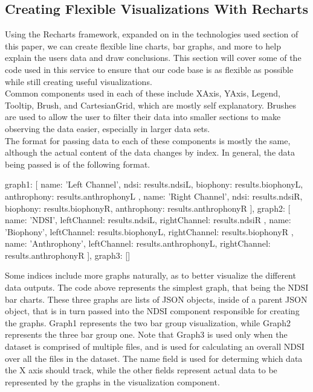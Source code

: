 \subsection{Creating Flexible Visualizations With Recharts}
Using the Recharts framework, expanded on in the technologies used section of this paper, we can create flexible line charts, bar graphs, and more to help explain the user\textquotesingle s data and draw conclusions. This section will cover some of the code used in this service to ensure that our code base is as flexible as possible while still creating useful visualizations.\\

\noindent Common components used in each of these include XAxis, YAxis, Legend, Tooltip, Brush, and CartesianGrid, which are mostly self explanatory. Brushes are used to allow the user to filter their data into smaller sections to make observing the data easier, especially in larger data sets.\\

\noindent The format for passing data to each of these components is mostly the same, although the actual content of the data changes by index. In general, the data being passed is of the following format.

\begin{javascriptcode}
  {
    graph1: [
              {
                name: 'Left Channel',
                ndsi: results.ndsiL,
                biophony: results.biophonyL,
                anthrophony: results.anthrophonyL
              },
              {
                name: 'Right Channel',
                ndsi: results.ndsiR,
                biophony: results.biophonyR,
                anthrophony: results.anthrophonyR
              }
            ],
    graph2: [
              {
                name: 'NDSI',
                leftChannel: results.ndsiL,
                rightChannel: results.ndsiR
              },
              {
                name: 'Biophony',
                leftChannel: results.biophonyL,
                rightChannel: results.biophonyR
              },
              {
                name: 'Anthrophony',
                leftChannel: results.anthrophonyL,
                rightChannel: results.anthrophonyR
              }
            ],
    graph3: []
  }
\end{javascriptcode}

\noindent Some indices include more graphs naturally, as to better visualize the different data outputs. The code above represents the simplest graph, that being the NDSI bar charts. These three graphs are lists of JSON objects, inside of a parent JSON object, that is in turn passed into the NDSI component responsible for creating the graphs. Graph1 represents the two bar group visualization, while Graph2 represents the three bar group one. Note that Graph3 is used only when the dataset is comprised of multiple files, and is used for calculating an overall NDSI over all the files in the dataset. The name field is used for determing which data the X axis should track, while the other fields represent actual data to be represented by the graphs in the visualization component.





